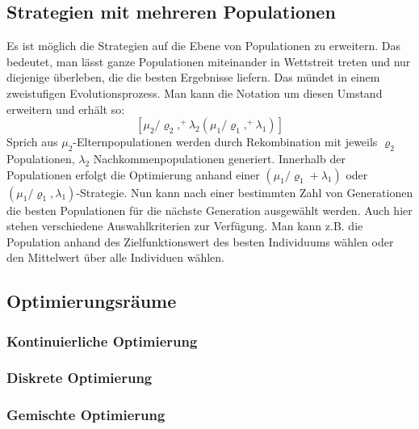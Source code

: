 \subsection{Strategien mit mehreren Populationen}
Es ist möglich die Strategien auf die Ebene von Populationen zu erweitern. Das bedeutet, man lässt ganze Populationen miteinander in Wettstreit treten und nur diejenige überleben, die die besten Ergebnisse liefern. Das mündet in einem zweistufigen Evolutionsprozess. Man kann die Notation um diesen Umstand erweitern und erhält so:
$$
[\mu_2/\varrho_2,^{+}\lambda_2(\mu_1/\varrho_1,^{+}\lambda_1)]
$$
Sprich aus $\mu_2$-Elternpopulationen werden durch Rekombination mit jeweils $\varrho_2$ Populationen, $\lambda_2$ Nachkommenpopulationen generiert. Innerhalb der Populationen erfolgt die Optimierung anhand einer $({\mu_1}/{\varrho_1}+\lambda_1)$ oder $({\mu_1}/{\varrho_1},\lambda_1)$-Strategie. Nun kann nach einer bestimmten Zahl von Generationen die besten Populationen für die nächste Generation ausgewählt werden. Auch hier stehen verschiedene Auswahlkriterien zur Verfügung. Man kann z.B. die Population anhand des Zielfunktionswert des besten Individuums wählen oder den Mittelwert über alle Individuen wählen.
%
\subsection{Optimierungsräume}
\lipsum[1]
%
\subsubsection{Kontinuierliche Optimierung}
%
\lipsum[1]
%
\subsubsection{Diskrete Optimierung}
%
\lipsum[1]
%
\subsubsection{Gemischte Optimierung}
%
\lipsum[1]
%

